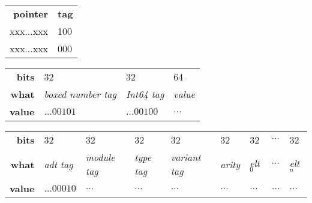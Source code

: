 


  \begin{tabular}{rl}
    \textbf{pointer}   & \textbf{tag} \\
    \textsf{xxx...xxx} & \textsf{100} \\
    \textsf{xxx...xxx} & \textsf{000}
  \end{tabular}

  \begin{tabular}{rlll}
    \textbf{bits}  & 32               & 32        & 64 \\
    \textbf{what}  & \textit{boxed number tag} & \textit{Int64 tag} & \textit{value} \\
    \textbf{value} & $\ldots{}00101$ & $\ldots{}00100$ & $\ldots{}$
  \end{tabular}

  \begin{tabular}{rllllllll}
    \textbf{bits}  & 32              & 32 & 32 & 32 & 32 & 32 & $\cdots$ & 32 \\
    \textbf{what}  & \textit{adt tag} & \textit{module tag} & \textit{type tag} & \textit{variant tag} & \textit{arity} & \textit{elt$_0$} & $\cdots$ & \textit{elt$_n$} \\
    \textbf{value} & $\ldots{}00010$ & $\ldots{}$ & $\ldots{}$ & $\ldots{}$ & $\ldots{}$ & $\ldots{}$ & $\ldots{}$ & $\ldots{}$
  \end{tabular}

